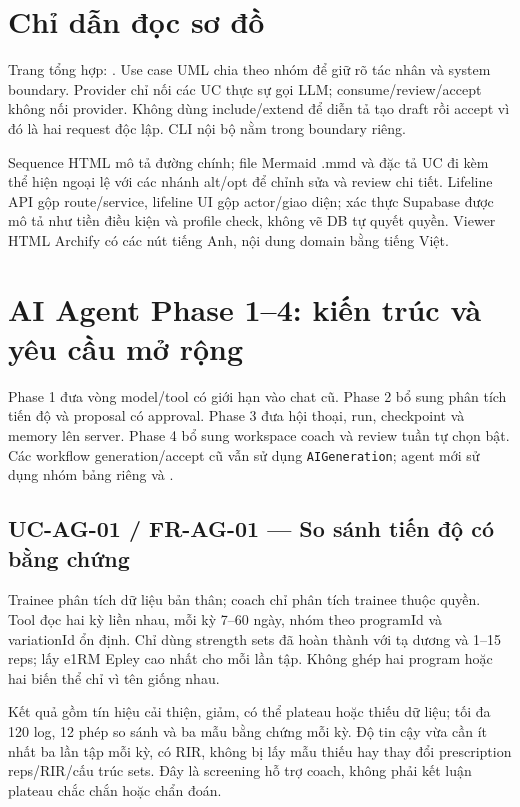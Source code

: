 \documentclass[12pt,a4paper]{article}
\newcommand{\code}[1]{\texttt{#1}}
\begin{document}
\section{Chỉ dẫn đọc sơ đồ}
Trang tổng hợp: . Use case UML chia theo nhóm để giữ rõ tác nhân và system boundary. Provider chỉ nối các UC thực sự gọi LLM; consume/review/accept không nối provider. Không dùng include/extend để diễn tả tạo draft rồi accept vì đó là hai request độc lập. CLI nội bộ nằm trong boundary riêng.

Sequence HTML mô tả đường chính; file Mermaid .mmd và đặc tả UC đi kèm thể hiện ngoại lệ với các nhánh alt/opt để chỉnh sửa và review chi tiết. Lifeline API gộp route/service, lifeline UI gộp actor/giao diện; xác thực Supabase được mô tả như tiền điều kiện và profile check, không vẽ DB tự quyết quyền. Viewer HTML Archify có các nút tiếng Anh, nội dung domain bằng tiếng Việt.

\clearpage
\section{AI Agent Phase 1--4: kiến trúc và yêu cầu mở rộng}
\label{agent-phases}
Phase 1 đưa vòng model/tool có giới hạn vào chat cũ. Phase 2 bổ sung phân tích tiến độ và proposal có approval. Phase 3 đưa hội thoại, run, checkpoint và memory lên server. Phase 4 bổ sung workspace coach và review tuần tự chọn bật. Các workflow generation/accept cũ vẫn sử dụng \code{AIGeneration}; agent mới sử dụng nhóm bảng riêng và .

\subsection{UC-AG-01 / FR-AG-01 --- So sánh tiến độ có bằng chứng}
Trainee phân tích dữ liệu bản thân; coach chỉ phân tích trainee thuộc quyền. Tool đọc hai kỳ liền nhau, mỗi kỳ 7--60 ngày, nhóm theo programId và variationId ổn định. Chỉ dùng strength sets đã hoàn thành với tạ dương và 1--15 reps; lấy e1RM Epley cao nhất cho mỗi lần tập. Không ghép hai program hoặc hai biến thể chỉ vì tên giống nhau.

Kết quả gồm tín hiệu cải thiện, giảm, có thể plateau hoặc thiếu dữ liệu; tối đa 120 log, 12 phép so sánh và ba mẫu bằng chứng mỗi kỳ. Độ tin cậy vừa cần ít nhất ba lần tập mỗi kỳ, có RIR, không bị lấy mẫu thiếu hay thay đổi prescription reps/RIR/cấu trúc sets. Đây là screening hỗ trợ coach, không phải kết luận plateau chắc chắn hoặc chẩn đoán.
\end{document}
